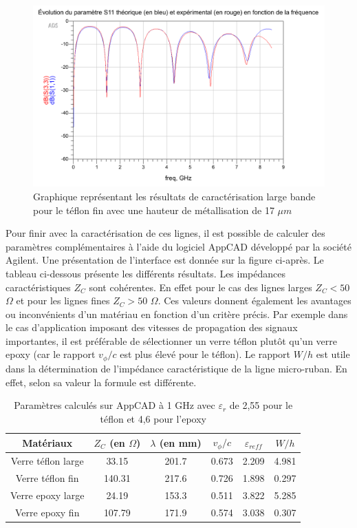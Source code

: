 \documentclass[french]{article}
\begin{document}
\begin{figure}[H]
	\centering
	\includegraphics[scale=0.26]{../2carac/caract_large_bande/caract_teflonfin_t_17_micron.png}
	\caption{Graphique représentant les résultats de caractérisation large bande pour le téflon fin avec une hauteur de métallisation de 17 $\mu m$}
	\label{fig:amelioration_teflon_fin}
\end{figure}

Pour finir avec la caractérisation de ces lignes, il est possible de calculer des paramètres complémentaires à l'aide du logiciel AppCAD développé par la société Agilent. Une présentation de l'interface est donnée sur la figure ci-après. Le tableau ci-dessous présente les différents résultats. Les impédances caractéristiques $Z_C$ sont cohérentes. En effet pour le cas des lignes larges $Z_C<50$ $\Omega$ et pour les lignes fines $Z_C>50$ $\Omega$. Ces valeurs donnent également les avantages ou inconvénients d'un matériau en fonction d'un critère précis. Par exemple dans le cas d'application imposant des vitesses de propagation des signaux importantes, il est préférable de sélectionner un verre téflon plutôt qu'un verre epoxy (car le rapport $v_{\phi}/c$ est plus élevé pour le téflon). Le rapport $W/h$ est utile dans la détermination de l'impédance caractéristique de la ligne micro-ruban. En effet, selon sa valeur la formule est différente. 

\begin{table}[H]
	\centering
	\begin{tabular}{|c|c|c|c|c|c|}
		\hline
		Matériaux & $Z_C$ (en $\Omega$) & $\lambda$ (en mm) & $v_{\phi}/c$ & $\varepsilon_{reff}$ & $W/h$\\
		\hline
		Verre téflon large & 33.15 & 201.7 & 0.673 & 2.209 & 4.981\\
		\hline
		Verre téflon fin & 140.31 & 217.6 & 0.726 & 1.898 & 0.297\\
		\hline
		Verre epoxy large & 24.19 & 153.3 & 0.511 & 3.822 & 5.285\\
		\hline
		Verre epoxy fin & 107.79 & 171.9 & 0.574 & 3.038 & 0.307\\
		\hline
	\end{tabular}
	\caption{Paramètres calculés sur AppCAD à 1 GHz avec $\varepsilon_r$ de 2,55 pour le téflon et 4,6 pour l'epoxy}
\end{table}
\end{document}
